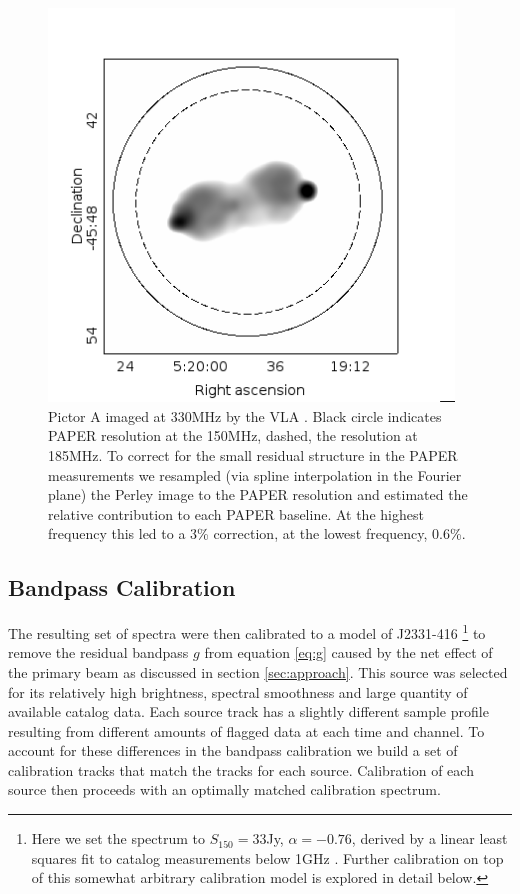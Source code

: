 \documentclass[preprint]{aastex}
\begin{document}
\begin{figure}
\includegraphics[width=0.96\textwidth]{plots/picA_Perley.png}
\caption{
Pictor A imaged at 330MHz by the VLA \citep{Perley:1997p9312}. Black circle
indicates PAPER resolution at the 150MHz, dashed, the resolution at 185MHz.  To
correct for the small residual structure in the PAPER measurements we resampled 
(via spline interpolation in the Fourier plane)
the Perley image to the PAPER resolution and estimated the relative contribution
 to each PAPER baseline.  At the highest frequency this
led to a 3\% correction, at the lowest frequency, 0.6\%.
\label{fig:pic_perley}}
\end{figure}

\subsection{Bandpass Calibration}
\label{sec:Calibration}

The resulting set of spectra were then calibrated to a model of J2331-416 
\footnote{Here we set the spectrum to $S_{150}=33$Jy, $\alpha=-0.76$, derived by a linear least squares fit to
catalog measurements below 1GHz \citep{Slee:1995p7541,Kuehr:1981p9628,Large:1981p7798,Burgess:2006p7814}.  Further calibration on top of this somewhat arbitrary calibration model
is explored in detail below. }
 to remove 
the residual bandpass $g$ from equation \ref{eq:g} caused by the net effect of the primary beam as discussed in section \ref{sec:approach}. 
This source
was selected for its relatively high brightness, spectral smoothness and large quantity
 of available catalog data. Each source track has a slightly different sample profile
 resulting from different amounts of flagged data at each time and channel. To account
 for these differences in the bandpass calibration we build a set of calibration tracks 
 that match the tracks for each source. Calibration of each source then proceeds with
 an optimally matched calibration spectrum.
\end{document}
